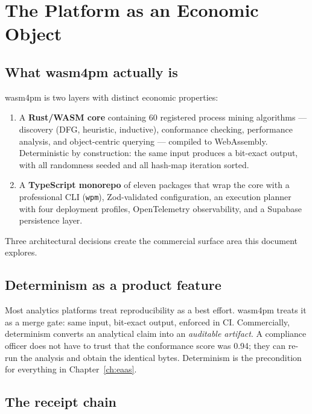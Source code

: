 \chapter{The Platform as an Economic Object}
\label{ch:platform}

\section{What wasm4pm actually is}

wasm4pm is two layers with distinct economic properties:

\begin{enumerate}[leftmargin=2em]
  \item A \textbf{Rust/WASM core} containing 60 registered process mining
        algorithms --- discovery (DFG, heuristic, inductive), conformance
        checking, performance analysis, and object-centric querying ---
        compiled to WebAssembly. Deterministic by construction: the same
        input produces a bit-exact output, with all randomness seeded and
        all hash-map iteration sorted.
  \item A \textbf{TypeScript monorepo} of eleven packages that wrap the core
        with a professional CLI (\texttt{wpm}), Zod-validated configuration,
        an execution planner with four deployment profiles, OpenTelemetry
        observability, and a Supabase persistence layer.
\end{enumerate}

Three architectural decisions create the commercial surface area this
document explores.

\section{Determinism as a product feature}

Most analytics platforms treat reproducibility as a best effort. wasm4pm
treats it as a merge gate: same input, bit-exact output, enforced in CI.
Commercially, determinism converts an analytical claim into an
\emph{auditable artifact}. A compliance officer does not have to trust that
the conformance score was 0.94; they can re-run the analysis and obtain the
identical bytes. Determinism is the precondition for everything in
Chapter~\ref{ch:eaas}.

\section{The receipt chain}

